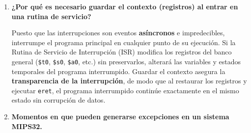 \documentclass[12pt,letterpaper]{article}
\begin{document}
\begin{enumerate}
    \vspace{0.2cm}
    La gestión se realiza mediante los registros del \textbf{Coprocesador 0 (CP0)}:
    \begin{itemize}
        \item \textbf{EPC (Exception Program Counter - Registro 14):} Almacena la dirección de la instrucción que fue interrumpida o que generó la excepción para retornar a ella.
        \item \textbf{Cause (Registro 13):} Contiene un código de causa (bits 2 al 6) que indica la razón del evento (interrupción, desbordamiento, fallo de dirección) y los bits de interrupción pendientes (IP).
        \item \textbf{Status (Registro 12):} Registro de control de estado. Contiene las máscaras para habilitar/deshabilitar interrupciones a nivel global (IE) y por dispositivo (IM).
        \item \textbf{BadVAddr (Registro 8):} Registra la dirección de memoria virtual que intentó un acceso no válido cuando ocurre un error de dirección.
    \end{itemize}

    \item \textbf{\large\color{UCBlue}¿Por qué es necesario guardar el contexto (registros) al entrar en una rutina de servicio?}
    
    \vspace{0.2cm}
    Puesto que las interrupciones son eventos \textbf{asíncronos} e impredecibles, interrumpe el programa principal en cualquier punto de su ejecución. Si la Rutina de Servicio de Interrupción (ISR) modifica los registros del banco general (\texttt{\$t0}, \texttt{\$s0}, \texttt{\$a0}, etc.) sin preservarlos, alterará las variables y estados temporales del programa interrumpido. Guardar el contexto asegura la \textbf{transparencia de la interrupción}, de modo que al restaurar los registros y ejecutar \texttt{eret}, el programa interrumpido continúe exactamente en el mismo estado sin corrupción de datos.

    \item \textbf{\large\color{UCBlue}Momentos en que pueden generarse excepciones en un sistema MIPS32.}
    

\end{enumerate}
\end{document}
